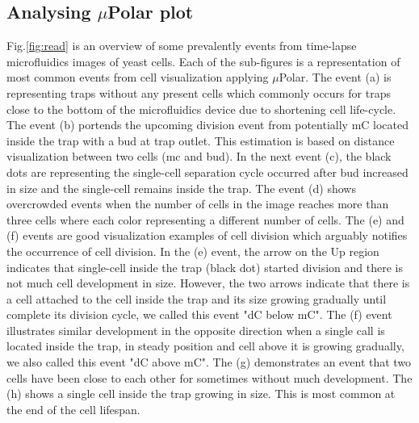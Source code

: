 \documentclass[conference]{IEEEtran}
\begin{document}
\subsection{Analysing $\mu$Polar plot}

Fig.\ref{fig:read} is an overview of some prevalently events from time-lapse microfluidics images of yeast cells. Each of the sub-figures is a representation of most common events from cell visualization applying $\mu$Polar. The event (a) is representing traps without any present cells which commonly occurs for traps close to the bottom of the microfluidics device due to shortening cell life-cycle. The event (b) portends the upcoming division event from potentially mC located inside the trap with a bud at trap outlet. This estimation is based on distance visualization between two cells (mc and bud). In the next event (c), the black dots are representing the single-cell separation cycle occurred after bud increased in size and the single-cell remains inside the trap. The event (d) shows overcrowded events when the number of cells in the image reaches more than three cells where each color representing a different number of cells. The (e) and (f) events are good visualization examples of cell division which arguably notifies the occurrence of cell division. In the (e) event, the arrow on the Up region indicates that single-cell inside the trap (black dot) started division and there is not much cell development in size. However, the two arrows indicate that there is a cell attached to the cell inside the trap and its size growing gradually until complete its division cycle, we called this event "dC below mC". The (f) event illustrates similar development in the opposite direction when a single call is located inside the trap, in steady position and cell above it is growing gradually, we also called this event "dC above mC". The (g) demonstrates an event that two cells have been close to each other for sometimes without much development. The (h) shows a single cell inside the trap growing in size. This is most common at the end of the cell lifespan.
\end{document}
